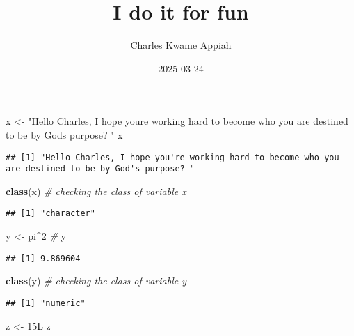 \documentclass[
]{article}
\title{I do it for fun}
\author{Charles Kwame Appiah}
\date{2025-03-24}
\newenvironment{Shaded}{\begin{snugshade}}{\end{snugshade}}
\newcommand{\CommentTok}[1]{\textcolor[rgb]{0.56,0.35,0.01}{\textit{#1}}}
\newcommand{\DataTypeTok}[1]{\textcolor[rgb]{0.13,0.29,0.53}{#1}}
\newcommand{\DecValTok}[1]{\textcolor[rgb]{0.00,0.00,0.81}{#1}}
\newcommand{\FunctionTok}[1]{\textcolor[rgb]{0.13,0.29,0.53}{\textbf{#1}}}
\newcommand{\NormalTok}[1]{#1}
\newcommand{\OtherTok}[1]{\textcolor[rgb]{0.56,0.35,0.01}{#1}}
\newcommand{\SpecialCharTok}[1]{\textcolor[rgb]{0.81,0.36,0.00}{\textbf{#1}}}
\newcommand{\StringTok}[1]{\textcolor[rgb]{0.31,0.60,0.02}{#1}}
\begin{document}
\maketitle

\begin{Shaded}
\begin{Highlighting}[]
\NormalTok{x }\OtherTok{\textless{}{-}} \StringTok{"Hello Charles, I hope you\textquotesingle{}re working hard to become who you are destined to be by God\textquotesingle{}s purpose? "}
\NormalTok{x}
\end{Highlighting}
\end{Shaded}

\begin{verbatim}
## [1] "Hello Charles, I hope you're working hard to become who you are destined to be by God's purpose? "
\end{verbatim}

\begin{Shaded}
\begin{Highlighting}[]
\FunctionTok{class}\NormalTok{(x) }\CommentTok{\# checking the class of variable x}
\end{Highlighting}
\end{Shaded}

\begin{verbatim}
## [1] "character"
\end{verbatim}

\begin{Shaded}
\begin{Highlighting}[]
\NormalTok{y }\OtherTok{\textless{}{-}}\NormalTok{ pi}\SpecialCharTok{\^{}}\DecValTok{2} \CommentTok{\# }
\NormalTok{y}
\end{Highlighting}
\end{Shaded}

\begin{verbatim}
## [1] 9.869604
\end{verbatim}

\begin{Shaded}
\begin{Highlighting}[]
\FunctionTok{class}\NormalTok{(y) }\CommentTok{\# checking the class of variable y}
\end{Highlighting}
\end{Shaded}

\begin{verbatim}
## [1] "numeric"
\end{verbatim}

\begin{Shaded}
\begin{Highlighting}[]
\NormalTok{z }\OtherTok{\textless{}{-}} \DecValTok{15}\DataTypeTok{L}
\NormalTok{z}
\end{Highlighting}
\end{Shaded}
\end{document}
